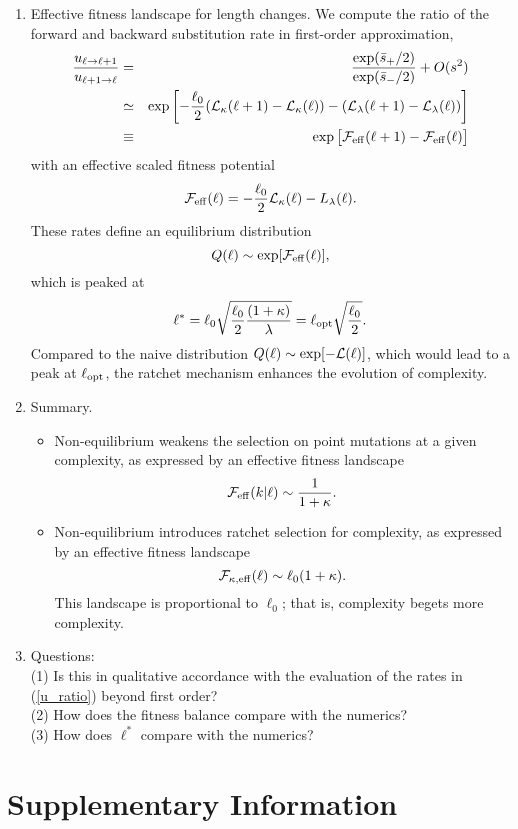 \documentclass[10pt,a4paper]{article}
\renewcommand{\L}{{\cal L}}
\newcommand{\F}{{\cal F}}
\newcommand{\EQ}{\begin{equation}}
\newcommand{\EE}{\end{equation}}
\newcommand{\EQA}{\begin{eqnarray}}
\newcommand{\EEA}{\end{eqnarray}}
\begin{document}
{\begin{enumerate}
\item Effective fitness landscape for length changes. We compute the ratio of the forward and backward substitution rate in first-order approximation,
\EQA
\frac{u_{\ell \to \ell+1}}{u_{\ell + 1 \to \ell}} & = & \frac{\exp(\bar s_+/2)}{\exp(\bar s_-/2)} +O(s^2)
\\
& \simeq & \exp \left [ - \frac{\ell_0}{2} (\L_\kappa (\ell+1) - \L_\kappa (\ell)) - (\L_\lambda (\ell+1) - \L_\lambda (\ell)) \right ]
\\
& \equiv & \exp \big [ \F_{\rm eff} (\ell+1) - \F_{\rm eff} (\ell) \big ]
\label{u_ratio}
\EEA
with an effective scaled fitness potential
\EQ
\F_{\rm eff} (\ell) = - \frac{\ell_0}{2} \L_\kappa (\ell) - L_\lambda (\ell) .
 \EE
These rates define an equilibrium distribution
\EQ
Q(\ell) \sim \exp [ \F_{\rm eff} (\ell)],
\EE
which is peaked at
\EQ
\ell^* = \ell_0 \sqrt{ \frac{\ell_0}{2} \frac{(1+\kappa)}{\lambda}} = \ell_{\rm opt} \sqrt{ \frac{\ell_0}{2}} .
\EE
Compared to the naive distribution $Q(\ell) \sim \exp [ - \L (\ell)]$, which would lead to a peak at $\ell_{\rm opt}$, the ratchet mechanism enhances the evolution of complexity.

\item Summary.
\begin{itemize}
\item Non-equilibrium weakens the selection on point mutations at a given complexity, as expressed by an effective fitness landscape
\EQ
\F_{\rm eff} (k|\ell) \sim \frac{1}{1 + \kappa} .
\EE
\item Non-equilibrium introduces ratchet selection for complexity, as expressed by an effective fitness landscape
\EQ
\F_{\kappa, \rm eff} (\ell) \sim \ell_0(1+ \kappa).
\EE
This landscape is proportional to $\ell_0$; that is, complexity begets more complexity.
\end{itemize}

\item Questions:\\
(1) Is this in qualitative accordance with the evaluation of the rates in (\ref{u_ratio}) beyond first order?
\\
(2) How does the fitness balance compare with the numerics?
\\
(3) How does $\ell^*$ compare with the numerics?
\end{enumerate}
}

\clearpage
\section*{Supplementary Information}
\end{document}
